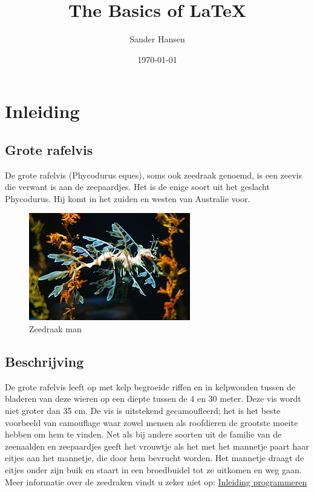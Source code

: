 \documentclass[12pt]{article}
\begin{document}
\title{The Basics of \LaTeX{}}
\author{Sander Hansen}
\date{\today}
\maketitle

\clearpage
\section{Inleiding}

\subsection{Grote rafelvis}
De grote rafelvis (Phycodurus eques), soms ook zeedraak genoemd, is een zeevis die verwant is aan de zeepaardjes. Het is de enige soort uit het geslacht Phycodurus. Hij komt in het zuiden en westen van Australie voor.

\begin{figure}[ht!]
\centering
\includegraphics[]{zeedraak.jpg}
\caption{Zeedraak man}
\end{figure}

\subsection{Beschrijving}
De grote rafelvis leeft op met kelp begroeide riffen en in kelpwouden tussen de bladeren van deze wieren op een diepte tussen de 4 en 30 meter. Deze vis wordt niet groter dan 35 cm. De vis is uitstekend gecamoufleerd; het is het beste voorbeeld van camouflage waar zowel mensen als roofdieren de grootste moeite hebben om hem te vinden.
Net als bij andere soorten uit de familie van de zeenaalden en zeepaardjes geeft het vrouwtje als het met het mannetje paart haar eitjes aan het mannetje, die door hem bevrucht worden. Het mannetje draagt de eitjes onder zijn buik en staart in een broedbuidel tot ze uitkomen en weg gaan.
\\
Meer informatie over de zeedraken vindt u zeker niet op:
\href{http://student.uva.nl/inc/az}{Inleiding programmeren}
\end{document}
